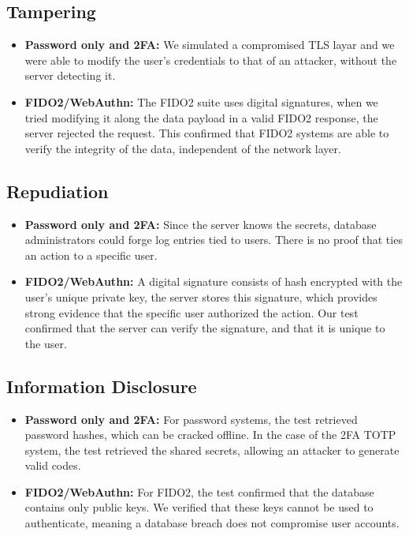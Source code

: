 \subsection{Tampering}
\begin{itemize}
    \item \textbf{Password only and 2FA:} We simulated a compromised TLS layar and we were able to modify the user's credentials to that of an attacker, without the server detecting it.
    \item \textbf{FIDO2/WebAuthn:} The FIDO2 suite uses digital signatures, when we tried modifying it along the data payload in a valid FIDO2 response, the server rejected the request. This confirmed that FIDO2  systems are able to verify the integrity of the data, independent of the network layer.
\end{itemize}

\subsection{Repudiation}
\begin{itemize}
    \item \textbf{Password only and 2FA:} Since the server knows the secrets, database administrators could forge log entries tied to users. There is no proof that ties an action to a specific user.
    \item \textbf{FIDO2/WebAuthn:} A digital signature consists of hash encrypted with the user's unique private key, the server stores this signature, which provides strong evidence that the specific user authorized the action. Our test confirmed that the server can verify the signature, and that it is unique to the user.
\end{itemize}

\subsection{Information Disclosure}
\begin{itemize}
    \item \textbf{Password only and 2FA:} For password systems, the test retrieved password hashes, which can be cracked offline. In the case of the 2FA TOTP system, the test retrieved the shared secrets, allowing an attacker to generate valid codes.
    \item \textbf{FIDO2/WebAuthn:} For FIDO2, the test confirmed that the database contains only public keys. We verified that these keys cannot be used to authenticate, meaning a database breach does not compromise user accounts.
\end{itemize}

